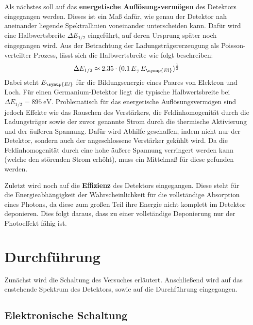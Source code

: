     Als nächstes soll auf das \textbf{energetische Auflösungsvermögen} des Detektors eingegangen
    werden. Dieses ist ein Maß dafür, wie genau der Detektor nah aneinander liegende Spektrallinien
    voneinander unterscheiden kann. Dafür wird eine Halbwertsbreite $\Delta E_{1/2}$ eingeführt, auf deren
    Ursprung später noch eingegangen wird. Aus der Betrachtung der Ladungsträgererzeugung als
    Poisson-verteilter Prozess, lässt sich die Halbwertsbreite wie folgt beschreiben:
    \begin{align}
      \Delta E_{1/2} \approx 2.35\cdot(0.1\,E_\gamma\,E_{\symup{El}})^{\frac{1}{2}}
      \label{eqn:auflsg}
    \end{align}
    Dabei steht $E_{\symup{El}}$ für die Bildungsenergie eines Paares von Elektron und Loch.
    Für einen Germanium-Detektor liegt die typische Halbwertsbreite bei
    $\Delta E_{1/2} =\SI{895}{\electronvolt}$.
    Problematisch für das energetische Auflösungsvermögen sind jedoch Effekte wie das Rauschen
    des Verstärkers, die Feldinhomogenität durch die Ladungsträger sowie der zuvor genannte
    Strom durch die thermische Aktivierung und der äußeren Spannung.
    Dafür wird Abhilfe geschaffen, indem nicht nur der Detektor, sondern auch der
    angeschlossene Verstärker gekühlt wird. Da die Feldinhomogenität durch eine hohe
    äußere Spannung verringert werden kann (welche den störenden Strom erhöht), muss ein Mittelmaß
    für diese gefunden werden.

    Zuletzt wird noch auf die \textbf{Effizienz} des Detektors eingegangen.
    Diese steht für die Energieabhängigkeit der Wahrscheinlichkeit für die vollständige Absorption
    eines Photons, da diese zum großen Teil ihre Energie nicht komplett im Detektor deponieren.
    Dies folgt daraus, dass zu einer vollständige Deponierung nur der Photoeffekt fähig ist.

\section{Durchführung}
\label{sec:Durchführung}

    Zunächst wird die Schaltung des Versuches erläutert. Anschließend wird auf das
    enstehende Spektrum des Detektors, sowie auf die Durchführung eingegangen.

    \subsection{Elektronische Schaltung}

